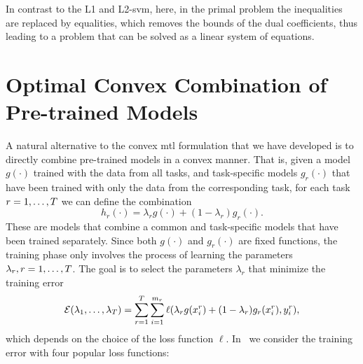 In contrast to the L1 and L2-\acrshort{svm}, here, in the primal problem the inequalities are replaced by equalities, which removes the bounds of the dual coefficients, thus leading to a problem that can be solved as a linear system of equations.


\section{Optimal Convex Combination of Pre-trained Models}\label{subsec:optimal_comb}
A natural alternative to the convex \acrshort{mtl} formulation that we have developed is to directly combine pre-trained models in a convex manner. That is, given a model $g(\cdot)$ trained with the data from all tasks, and task-specific models $g_r(\cdot)$ that have been trained with only the data from the corresponding task, for each task $r=1,\ldots,T$ we can define the combination
\begin{equation}
    \nonumber
    h_r(\cdot) = \lambda_r g(\cdot) + (1 - \lambda_r) g_r(\cdot) .
\end{equation}
These are models that combine a common and task-specific models that have been trained separately. Since both $g(\cdot)$ and $g_r(\cdot)$ are fixed functions, the training phase only involves the process of learning the parameters $\lambda_r, r=1, \ldots, T$. The goal is to select the parameters $\lambda_r$ that minimize the training error
\begin{equation}
    \nonumber
    \mathcal{E}(\lambda_1, \ldots, \lambda_T) = \sum_{r=1}^T \sum_{i=1}^{m_r} \ell(\lambda_r g(x_i^r) + (1 - \lambda_r) g_r(x_i^r), y_i^r) ,
\end{equation}
which depends on the choice of the loss function $\ell$. 
In~\cite{RuizAD21} we consider the training error with four popular loss functions:
